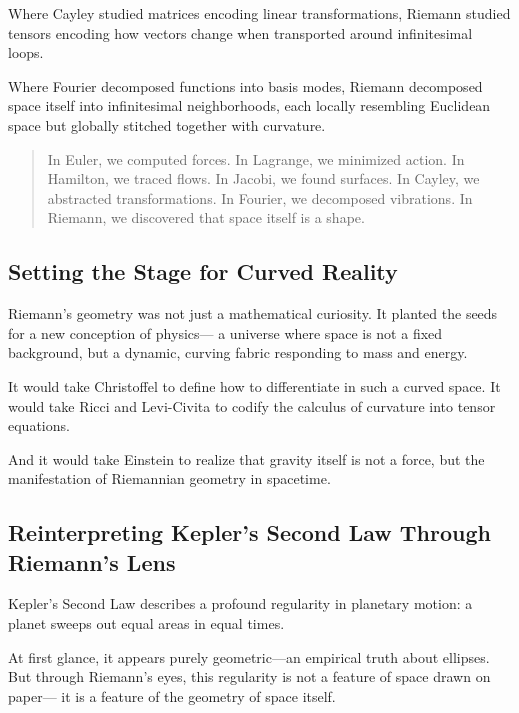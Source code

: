 Where Cayley studied matrices encoding linear transformations,  
Riemann studied tensors encoding how vectors change when transported around infinitesimal loops.

Where Fourier decomposed functions into basis modes,  
Riemann decomposed space itself into infinitesimal neighborhoods,  
each locally resembling Euclidean space but globally stitched together with curvature.

\bigskip

\begin{quote}
In Euler, we computed forces.  
In Lagrange, we minimized action.  
In Hamilton, we traced flows.  
In Jacobi, we found surfaces.  
In Cayley, we abstracted transformations.  
In Fourier, we decomposed vibrations.  
In Riemann, we discovered that space itself is a shape.
\end{quote}

\subsection*{Setting the Stage for Curved Reality}

Riemann’s geometry was not just a mathematical curiosity.  
It planted the seeds for a new conception of physics—  
a universe where space is not a fixed background, but a dynamic, curving fabric responding to mass and energy.

It would take Christoffel to define how to differentiate in such a curved space.  
It would take Ricci and Levi-Civita to codify the calculus of curvature into tensor equations.

And it would take Einstein to realize that gravity itself is not a force,  
but the manifestation of Riemannian geometry in spacetime.



\subsection*{Reinterpreting Kepler’s Second Law Through Riemann’s Lens}

Kepler’s Second Law describes a profound regularity in planetary motion:  
a planet sweeps out equal areas in equal times.

At first glance, it appears purely geometric—an empirical truth about ellipses.  
But through Riemann’s eyes, this regularity is not a feature of space drawn on paper—  
it is a feature of the geometry of space itself.

\bigskip

